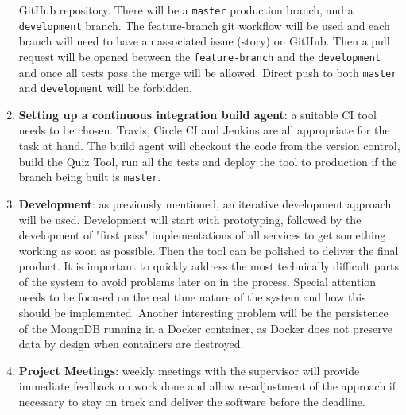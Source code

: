 \documentclass[11pt,fleqn,twoside]{article}
\begin{document}
\begin{enumerate}
    GitHub\cite{6} repository. There will be a \texttt{master} production branch, and a \texttt{development} branch.
    The feature-branch git workflow \cite{7} will be used and each branch will need to have an associated issue (story)
    on GitHub. Then a pull request will be opened between the \texttt{feature-branch} and the \texttt{development}
    and once all tests pass the merge will be allowed. Direct push to both \texttt{master} and \texttt{development}
    will be forbidden.
  \item \textbf{Setting up a continuous integration build agent}: a suitable CI tool needs to be chosen. Travis\cite{8}, Circle CI\cite{9}
    and Jenkins\cite{10} are all appropriate for the task at hand. The build agent will checkout the code from the version control,
    build the Quiz Tool, run all the tests and deploy the tool to production if the branch being built is \texttt{master}.
  \item \textbf{Development}: as previously mentioned, an iterative development approach will be used. Development will start
    with prototyping, followed by the development of "first pass" implementations of all services to get something
    working as soon as possible. Then the tool can be polished to deliver the final product. It is important to quickly
    address the most technically difficult parts of the system to avoid problems later on in the process. Special
    attention needs to be focused on the real time nature of the system and how this should be implemented. Another
    interesting problem will be the persistence of the MongoDB running in a Docker container, as Docker does not
    preserve data by design when containers are destroyed.
  \item \textbf{Project Meetings}: weekly meetings with the supervisor will provide immediate feedback on work done
    and allow re-adjustment of the approach if necessary to stay on track and deliver the software before the deadline.
\end{enumerate}

\end{document}
